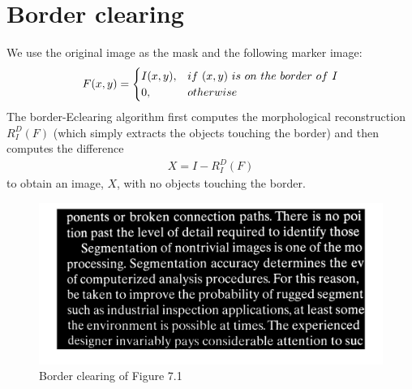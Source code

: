 \documentclass[11pt,oneside]{book}
\begin{document}
\section{Border clearing}
We use the original image as the mask and the following marker image:
\begin{eqnarray}F(x,y)=
\begin{cases}
I(x,y), &if\ (x, y)\ is\ on\ the\ border\ of\ I \cr 0,&otherwise\end{cases}
\end{eqnarray}
The border-Eclearing algorithm first computes the morphological reconstruction $R_I^D(F)$ (which simply extracts the objects touching the border) and then computes the difference
\begin{align}
  X=I-R_I^D(F)
\end{align}
to obtain an image, $X$, with no objects touching the border.
\begin{figure}[!htb]
   \centering  
   \includegraphics[width=1\textwidth]{images/8/image_3.jpg}
   \caption{Border clearing of Figure 7.1}
\end{figure}
\end{document}
